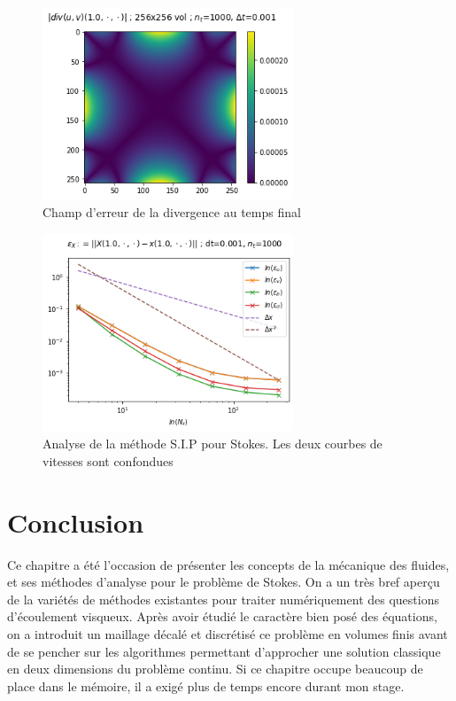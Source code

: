 \begin{figure}[htp]
    \centering
    \includegraphics[width=7.5cm]{Images/stokes/sip/Dh.png}
    \caption{Champ d'erreur de la divergence au temps final}
\end{figure}

\begin{figure}[htp]
    \centering
    \includegraphics[width=7.5cm]{Images/stokes/sip/analyse.png}
    \caption{Analyse de la méthode S.I.P pour Stokes. Les deux courbes de vitesses sont confondues}
\end{figure}

\newpage

\section{Conclusion}

Ce chapitre a été l'occasion de présenter les concepts de la mécanique des fluides, et ses méthodes d'analyse pour le problème de Stokes. On a un très bref aperçu de la variétés de méthodes existantes pour traiter numériquement des questions d'écoulement visqueux. Après avoir étudié le caractère bien posé des équations, on a introduit un maillage décalé et discrétisé ce problème en volumes finis avant de se pencher sur les algorithmes permettant d'approcher une solution classique en deux dimensions du problème continu. Si ce chapitre occupe beaucoup de place dans le mémoire, il a exigé plus de temps encore durant mon stage. 